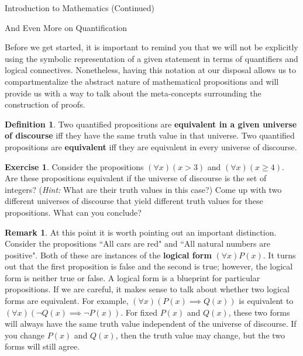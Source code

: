 \documentclass[11pt]{article}
\theoremstyle{definition}
\newtheorem{definition}[theorem]{Definition}
\newtheorem{exercise}[theorem]{Exercise}
\newtheorem{remark}[theorem]{Remark}
\begin{document}
\addtocounter{section}{0}

\begin{section}{Introduction to Mathematics (Continued)}

\addtocounter{subsection}{5}
\addtocounter{theorem}{87}

\begin{subsection}{And Even More on Quantification}

Before we get started, it is important to remind you that we will not be explicitly using the symbolic representation of a given statement in terms of quantifiers and logical connectives.  Nonetheless, having this notation at our disposal allows us to compartmentalize the abstract nature of mathematical propositions and will provide us with a way to talk about the meta-concepts surrounding the construction of proofs.

\begin{definition}
Two quantified propositions are \textbf{equivalent in a given universe of discourse} iff they have the same truth value in that universe.  Two quantified propositions are \textbf{equivalent} iff they are equivalent in every universe of discourse.
\end{definition}

\begin{exercise}
Consider the propositions $(\forall x)(x>3)$ and $(\forall x)(x\geq 4)$.  Are these propositions equivalent if the universe of discourse is the set of integers?  (\emph{Hint:}  What are their truth values in this case?)  Come up with two different universes of discourse that yield different truth values for these propositions.  What can you conclude?
\end{exercise}

\begin{remark}
At this point it is worth pointing out an important distinction.  Consider the propositions ``All cars are red" and ``All natural numbers are positive".  Both of these are instances of the \textbf{logical form} $(\forall x)P(x)$.  It turns out that the first proposition is false and the second is true; however, the logical form is neither true or false.  A logical form is a blueprint for particular propositions.  If we are careful, it makes sense to talk about whether two logical forms are equivalent.  For example, $(\forall x)(P(x)\implies Q(x))$ is equivalent to $(\forall x)(\neg Q(x)\implies \neg P(x))$.  For fixed $P(x)$ and $Q(x)$, these two forms will always have the same truth value independent of the universe of discourse.  If you change $P(x)$ and $Q(x)$, then the truth value may change, but the two forms will still agree.
\end{remark}


\end{subsection}
\end{section}
\end{document}
